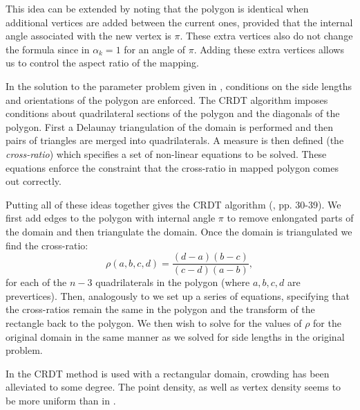 This idea can be extended by noting that the polygon is identical when additional vertices are added between the current ones, provided that the internal angle associated with the new vertex is $\pi$. These extra vertices also do not change the \sch formula since in  $\alpha_k=1$ for an angle of $\pi$. Adding these extra vertices allows us to control the aspect ratio of the mapping.

In the solution to the \sch parameter problem given in , conditions on the side lengths and orientations of the polygon are enforced. The CRDT algorithm imposes conditions about quadrilateral sections of the polygon and the diagonals of the polygon. First a Delaunay triangulation of the domain is performed and then pairs of triangles are merged into quadrilaterals. A measure is then defined (the \emph{cross-ratio}) which specifies a set of non-linear equations to be solved. These equations enforce the constraint that the cross-ratio in mapped polygon comes out correctly. 

Putting all of these ideas together gives the CRDT algorithm (\cite{driscoll}, pp. 30-39). We first add edges to the polygon with internal angle $\pi$ to remove enlongated parts of the domain and then triangulate the domain. Once the domain is triangulated we find the cross-ratio:
\begin{equation}
\rho(a,b,c,d) = \frac{(d-a)(b-c)}{(c-d)(a-b)},
\end{equation}
for each of the $n-3$ quadrilaterals in the polygon (where $a,b,c,d$ are prevertices). Then, analogously to  we set up a series of equations, specifying that the cross-ratios remain the same in the polygon and the transform of the rectangle back to the polygon. We then wish to solve for the values of $\rho$ for the original domain in the same manner as we solved for side lengths in the original problem. 

In  the CRDT method is used with a rectangular domain, crowding has been alleviated to some degree. The point density, as well as vertex density seems to be more uniform than in .


